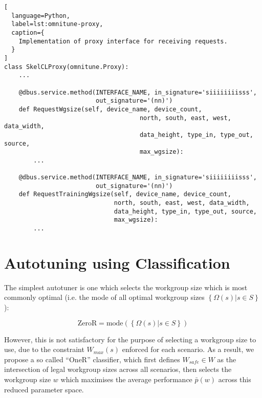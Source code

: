\begin{lstlisting}[
  language=Python,
  label=lst:omnitune-proxy,
  caption={
    Implementation of proxy interface for receiving requests.
  }
]
class SkelCLProxy(omnitune.Proxy):
    ...

    @dbus.service.method(INTERFACE_NAME, in_signature='siiiiiiiisss',
                         out_signature='(nn)')
    def RequestWgsize(self, device_name, device_count,
                                     north, south, east, west, data_width,
                                     data_height, type_in, type_out, source,
                                     max_wgsize):
        ...

    @dbus.service.method(INTERFACE_NAME, in_signature='siiiiiiiisss',
                         out_signature='(nn)')
    def RequestTrainingWgsize(self, device_name, device_count,
                              north, south, east, west, data_width,
                              data_height, type_in, type_out, source,
                              max_wgsize):
        ...
\end{lstlisting}

\section{Autotuning using Classification}



The simplest autotuner is one which selects the workgroup size which
is most commonly optimal (i.e. the mode of all optimal workgroup sizes
$\left\{ \Omega(s) | s \in S \right\}$):

\begin{equation}
\text{ZeroR} = \text{mode}( \left\{ \Omega(s) | s \in S \right\} )
\end{equation}

However, this is not satisfactory for the purpose of selecting a
workgroup size to use, due to the constraint $W_{max}(s)$ enforced for
each scenario. As a result, we propose a so called ``OneR''
classifier, which first defines $W_{safe} \in W$ as the intersection
of legal workgroup sizes across all scenarios, then selects the
workgroup size $w$ which maximises the average performance
$\bar{p}(w)$ across this reduced parameter space.

